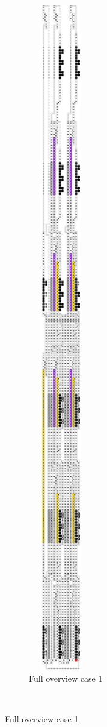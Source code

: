 \begin{figure}[H]
\begin{subfigure}[t]{0.3\textwidth}
\includegraphics[width=0.3\textwidth]{full_overview_case_1_colored}
        \caption{\label{fig:full_overview_case1_colored} Full overview case 1}
    \end{subfigure}%
    ~
\end{figure}